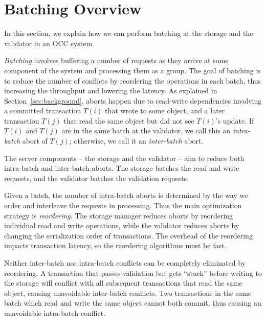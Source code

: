 \section{Batching Overview}\label{sec:overview}

In this section, we explain how we can perform batching at the storage and the validator in an OCC system. 

\emph{Batching} involves buffering a number of requests as they arrive at some component of the system and processing them as a group. The goal of batching is to reduce the number of conflicts by reordering the operations in each batch, thus increasing the throughput and lowering the latency. As explained in Section~\ref{sec:background}, aborts happen due to read-write dependencies involving a committed transaction $T(i)$ that wrote to some object, and a later transaction $T(j)$ that read the same object but did not see $T(i)$'s update. If $T(i)$ and $T(j)$ are in the same batch at the validator, we call this an \emph{intra-batch} abort of $T(j)$; otherwise, we call it an \emph{inter-batch} abort.

The server components -- the storage and the validator -- aim to reduce both intra-batch and inter-batch aborts. The storage batches the read and write requests, and the validator batches the validation requests.

Given a batch, the number of intra-batch aborts is determined by the way we order and interleave the requests in processing. Thus the main optimization strategy is \emph{reordering}. The storage manager reduces aborts by reordering individual read and write operations, while the validator reduces aborts by changing the serialization order of transactions. The overhead of the reordering impacts transaction latency, so the reordering algorithms must be fast.

Neither inter-batch nor intra-batch conflicts can be completely eliminated by reordering. A transaction that passes validation but gets ``stuck'' before writing to the storage will conflict with all subsequent transactions that read the same object, causing unavoidable inter-batch conflicts. Two transactions in the same batch which read and write the same object cannot both commit, thus causing an unavoidable intra-batch conflict.


